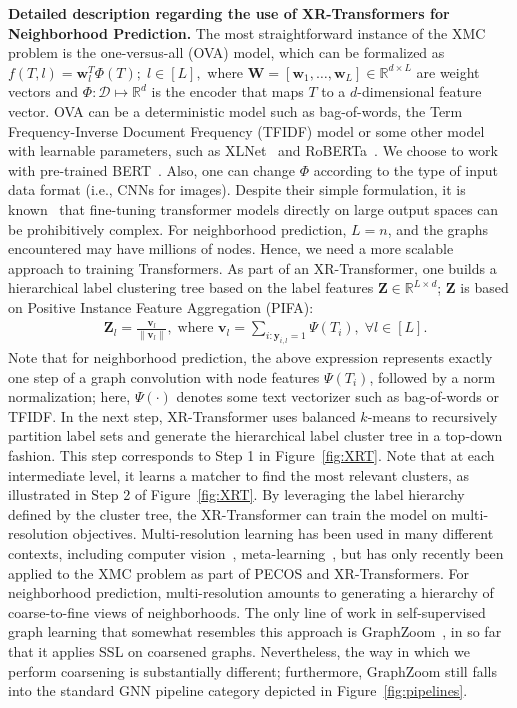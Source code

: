\documentclass{article} \usepackage{iclr2022_conference,times}
\begin{document}
\textbf{Detailed description regarding the use of XR-Transformers for Neighborhood Prediction.}
The most straightforward instance of the XMC problem is the one-versus-all (OVA) model, which can be formalized as $f(T,l) = \mathbf{w}_l^T \Phi(T);\;l\in[L],$ where $\mathbf{W} = [\mathbf{w}_1,\ldots,\mathbf{w}_L]\in \mathbb{R}^{d\times L}$ are weight vectors and $\Phi : \mathcal{D}\mapsto \mathbb{R}^d$ is the encoder that maps $T$ to a $d$-dimensional feature vector. OVA can be a deterministic model such as bag-of-words, the Term Frequency-Inverse Document Frequency (TFIDF) model or some other model with learnable parameters, such as XLNet~\citep{yang2019xlnet} and RoBERTa~\citep{liu2019roberta}. We choose to work with pre-trained BERT~\citep{devlin2018bert}. Also, one can change $\Phi$ according to the type of input data format (i.e., CNNs for images). Despite their simple formulation, it is known~\cite{chang2020taming} that fine-tuning transformer models directly on large output spaces can be prohibitively complex. For neighborhood prediction, $L=n$, and the graphs encountered may have millions of nodes. Hence, we need a more scalable approach to training Transformers. As part of an XR-Transformer, one builds a hierarchical label clustering tree based on the label features $\mathbf{Z}\in \mathbb{R}^{L\times d}$; $\mathbf{Z}$ is based on Positive Instance Feature Aggregation (PIFA):
\begin{align}
 & \mathbf{Z}_l = \frac{\mathbf{v}_l}{\|\mathbf{v}_l\|},\;\text{where }\mathbf{v}_l=\sum_{i:\mathbf{y}_{i,l}=1}\Psi(T_i),\;\forall l\in[L].
\end{align}
Note that for neighborhood prediction, the above expression represents exactly one step of a graph convolution with node features $\Psi(T_i)$, followed by a norm normalization; here, $\Psi(\cdot)$ denotes some text vectorizer such as bag-of-words or TFIDF. In the next step, XR-Transformer uses balanced $k$-means to recursively partition label sets and generate the hierarchical label cluster tree in a top-down fashion. This step corresponds to Step 1 in Figure~\ref{fig:XRT}. Note that at each intermediate level, it learns a matcher to find the most relevant clusters, as illustrated in Step 2 of Figure~\ref{fig:XRT}. By leveraging the label hierarchy defined by the cluster tree, the XR-Transformer can train the model on multi-resolution objectives. Multi-resolution learning has been used in many different contexts, including computer vision~\citep{lai2017deep,karras2017progressive,karras2019style,pedersoli2015coarse}, meta-learning~\citep{liu2019self}, but has only recently been applied to the XMC problem as part of PECOS and XR-Transformers. For neighborhood prediction, multi-resolution amounts to generating a hierarchy of coarse-to-fine views of neighborhoods. The only line of work in self-supervised graph learning that somewhat resembles this approach is GraphZoom~\citep{deng2020graphzoom}, in so far that it applies SSL on coarsened graphs. Nevertheless, the way in which we perform coarsening is substantially different; furthermore, GraphZoom still falls into the standard GNN pipeline category depicted in Figure~\ref{fig:pipelines}.
\end{document}
